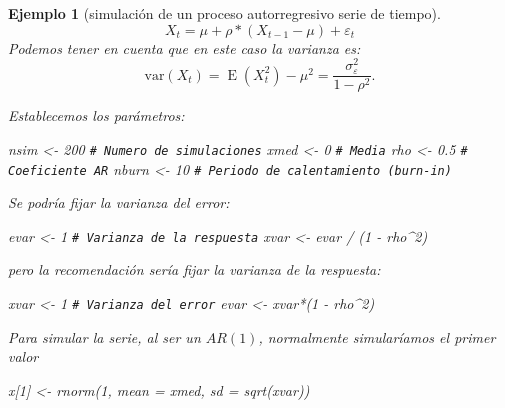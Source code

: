\documentclass[
  10pt,
]{book}
\newenvironment{Shaded}{\begin{snugshade}}{\end{snugshade}}
\newcommand{\AttributeTok}[1]{\textcolor[rgb]{0.77,0.63,0.00}{#1}}
\newcommand{\CommentTok}[1]{\textcolor[rgb]{0.56,0.35,0.01}{\textit{#1}}}
\newcommand{\DecValTok}[1]{\textcolor[rgb]{0.00,0.00,0.81}{#1}}
\newcommand{\FloatTok}[1]{\textcolor[rgb]{0.00,0.00,0.81}{#1}}
\newcommand{\FunctionTok}[1]{\textcolor[rgb]{0.00,0.00,0.00}{#1}}
\newcommand{\NormalTok}[1]{#1}
\newcommand{\OtherTok}[1]{\textcolor[rgb]{0.56,0.35,0.01}{#1}}
\newcommand{\SpecialCharTok}[1]{\textcolor[rgb]{0.00,0.00,0.00}{#1}}
\theoremstyle{break}
\newtheorem{example}{Ejemplo}[chapter]
\theoremstyle{nonumberplain}
\renewcommand{\CommentTok}[1]{\textcolor[rgb]{0.41,0.41,0.41}{\texttt{#1}}}
\begin{document}
\begin{example}[simulación de un proceso autorregresivo serie de tiempo]

\[X_t = \mu + \rho * (X_{t-1} - \mu) + \varepsilon_t\]
Podemos tener en cuenta que en este caso la varianza es:
\[\textrm{var}(X_t)=\operatorname{E}(X_t^2)-\mu^2=\frac{\sigma_\varepsilon^2}{1-\rho^2}.\]

Establecemos los parámetros:

\begin{Shaded}
\begin{Highlighting}[]
\NormalTok{nsim }\OtherTok{\textless{}{-}} \DecValTok{200}   \CommentTok{\# Numero de simulaciones}
\NormalTok{xmed }\OtherTok{\textless{}{-}} \DecValTok{0}     \CommentTok{\# Media}
\NormalTok{rho }\OtherTok{\textless{}{-}} \FloatTok{0.5}    \CommentTok{\# Coeficiente AR}
\NormalTok{nburn }\OtherTok{\textless{}{-}} \DecValTok{10}   \CommentTok{\# Periodo de calentamiento (burn{-}in)}
\end{Highlighting}
\end{Shaded}

Se podría fijar la varianza del error:

\begin{Shaded}
\begin{Highlighting}[]
\NormalTok{evar }\OtherTok{\textless{}{-}} \DecValTok{1}
\CommentTok{\# Varianza de la respuesta}
\NormalTok{xvar }\OtherTok{\textless{}{-}}\NormalTok{ evar }\SpecialCharTok{/}\NormalTok{ (}\DecValTok{1} \SpecialCharTok{{-}}\NormalTok{ rho}\SpecialCharTok{\^{}}\DecValTok{2}\NormalTok{)}
\end{Highlighting}
\end{Shaded}

pero la recomendación sería fijar la varianza de la respuesta:

\begin{Shaded}
\begin{Highlighting}[]
\NormalTok{xvar }\OtherTok{\textless{}{-}} \DecValTok{1}     
\CommentTok{\# Varianza del error}
\NormalTok{evar }\OtherTok{\textless{}{-}}\NormalTok{ xvar}\SpecialCharTok{*}\NormalTok{(}\DecValTok{1} \SpecialCharTok{{-}}\NormalTok{ rho}\SpecialCharTok{\^{}}\DecValTok{2}\NormalTok{)}
\end{Highlighting}
\end{Shaded}

Para simular la serie, al ser un \(AR(1)\), normalmente simularíamos el primer valor

\begin{Shaded}
\begin{Highlighting}[]
\NormalTok{x[}\DecValTok{1}\NormalTok{] }\OtherTok{\textless{}{-}} \FunctionTok{rnorm}\NormalTok{(}\DecValTok{1}\NormalTok{, }\AttributeTok{mean =}\NormalTok{ xmed, }\AttributeTok{sd =} \FunctionTok{sqrt}\NormalTok{(xvar))}
\end{Highlighting}
\end{Shaded}


\end{example}
\end{document}

